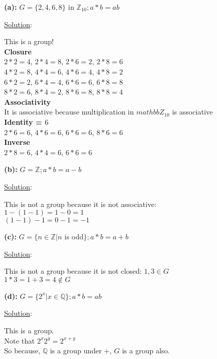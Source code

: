 \documentclass{article} %
\begin{document}
\textbf{(a): } $G = \{2,4,6,8\}$ in $\mathbb{Z}_{10}; a*b = ab$
\begin{addmargin}[1em]{0em}
\underline{Solution}: 
\begin{addmargin}[1em]{0em}
This is a group!
\\ \textbf{Closure}
\\$2 * 2 = 4$, $2 * 4 = 8$, $2 * 6 = 2$, $2 * 8 = 6$
\\$4 * 2 = 8$, $4 * 4 = 6$, $4 * 6 = 4$, $4 * 8 = 2$
\\$6 * 2 = 2$, $6 * 4 = 4$, $6 * 6 = 6$, $6 * 8 = 8$
\\$8 * 2 = 6$, $8 * 4 = 2$, $8 * 6 = 8$, $8 * 8 = 4$
\\ \textbf{Associativity}
\\It is associative because multiplication in $mathbb{Z}_{10}$ is associative
\\ \textbf{Identity = $6$}
\\$2 * 6 = 6$, $4 * 6 = 6$, $6 * 6 = 6$, $8 * 6 = 6$
\\ \textbf{Inverse}
\\$2 * 8 = 6$, $4 * 4 = 6$, $6 * 6 = 6$
\end{addmargin}
\end{addmargin}
\textbf{(b): } $G = \mathbb{Z}; a * b = a - b$
\begin{addmargin}[1em]{0em}
\underline{Solution}: 
\begin{addmargin}[1em]{0em}
This is not a group because it is not associative:
\\$1 - (1 - 1) = 1 - 0 = 1$
\\$(1 - 1) - 1 = 0 - 1 = -1$
\end{addmargin}
\end{addmargin}
\textbf{(c): } $G = \{n \in \mathbb{Z}| n$ is odd$\}; a * b = a + b$
\begin{addmargin}[1em]{0em}
\underline{Solution}: 
\begin{addmargin}[1em]{0em}
This is not a group because it is not closed:
$1, 3 \in G$
\\$1 * 3 = 1 + 3 = 4 \not\in G$
\end{addmargin}
\end{addmargin}
\textbf{(d): } $G = \{2^x| x \in \mathbb{Q}\}; a * b = ab$
\begin{addmargin}[1em]{0em}
\underline{Solution}: 
\begin{addmargin}[1em]{0em}
This is a group.
\\Note that $2^x2^y = 2^{x + y}$
\\So because, $\mathbb{Q}$ is a group under $+$, $G$ is a group also.
\end{addmargin}
\end{addmargin}
\end{document}
